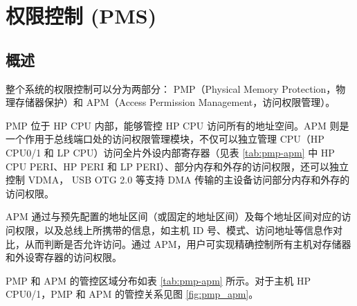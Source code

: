 \documentclass[main\_\_CN.tex]{subfiles}
\begin{document}

\ifglobal
\else
    {\let\clearpage\relax \listoftodos}
    {\let\clearpage\relax \listofdonetodos}
    \tableofcontents
\fi



\hypertarget{permcrtl}{}
\chapter{权限控制 (PMS)}
\label{mod:permctrl}


\section{概述}

\chipname{} 整个系统的权限控制可以分为两部分： PMP（Physical Memory Protection，物理存储器保护）和 APM（Access Permission Management，访问权限管理）。

PMP 位于 HP CPU 内部，能够管控 HP CPU 访问所有的地址空间。APM 则是一个作用于总线端口处的访问权限管理模块，不仅可以独立管理 CPU（HP CPU0/1 和 LP CPU）访问全片外设内部寄存器（见表 \ref{tab:pmp-apm} 中 HP CPU PERI、HP PERI 和 LP PERI）、部分内存和外存的访问权限，还可以独立控制 VDMA， USB OTG 2.0 等支持 DMA 传输的主设备访问部分内存和外存的访问权限。

APM 通过与预先配置的地址区间（或固定的地址区间）及每个地址区间对应的访问权限，以及总线上所携带的信息，如主机 ID 号、模式、访问地址等信息作对比，从而判断是否允许访问。通过 APM，用户可实现精确控制所有主机对存储器和外设寄存器的访问权限。

PMP 和 APM 的管控区域分布如表 \ref{tab:pmp-apm} 所示。对于主机 HP CPU0/1，PMP 和 APM 的管控关系见图 \ref{fig:pmp_apm}。
\end{document}
